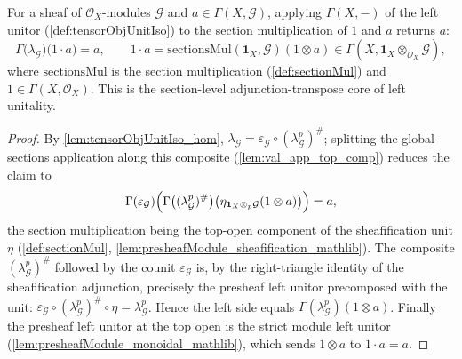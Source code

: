 \begin{lemma}
  \label{lem:sectionMul_unitor_core}
  For a sheaf of \(\mathcal{O}_X\)-modules \(\mathcal{G}\) and
  \(a \in \Gamma(X, \mathcal{G})\), applying \(\Gamma(X,-)\) of the left unitor
  (\cref{def:tensorObjUnitIso}) to the section multiplication of \(1\) and \(a\)
  returns \(a\):
  \[
    \Gamma\bigl(\lambda_{\mathcal{G}}\bigr)
      \bigl( 1 \cdot a \bigr) = a,
    \qquad
    1 \cdot a = \mathrm{sectionsMul}(\mathbf{1}_X, \mathcal{G})(1 \otimes a)
      \in \Gamma(X, \mathbf{1}_X \otimes_{\mathcal{O}_X} \mathcal{G}),
  \]
  where \(\mathrm{sectionsMul}\) is the section multiplication
  (\cref{def:sectionMul}) and \(1 \in \Gamma(X,\mathcal{O}_X)\). This is the
  section-level adjunction-transpose core of left unitality.
\end{lemma}

\begin{proof}
  By \cref{lem:tensorObjUnitIso_hom},
  \(\lambda_{\mathcal{G}} = \varepsilon_{\mathcal{G}} \circ
  (\lambda^p_{\mathcal{G}})^{\#}\); splitting the global-sections application along
  this composite (\cref{lem:val_app_top_comp}) reduces the claim to
  \[
    \Gamma(\varepsilon_{\mathcal{G}})
      \Bigl( \Gamma\bigl((\lambda^p_{\mathcal{G}})^{\#}\bigr)
        \bigl( \eta_{\mathbf{1}_X \otimes_p \mathcal{G}}(1 \otimes a) \bigr) \Bigr)
      = a,
  \]
  the section multiplication being the top-open component of the sheafification
  unit \(\eta\) (\cref{def:sectionMul},
  \cref{lem:presheafModule_sheafification_mathlib}). The composite
  \((\lambda^p_{\mathcal{G}})^{\#}\) followed by the counit
  \(\varepsilon_{\mathcal{G}}\) is, by the right-triangle identity of the
  sheafification adjunction, precisely the presheaf left unitor precomposed with
  the unit: \(\varepsilon_{\mathcal{G}} \circ (\lambda^p_{\mathcal{G}})^{\#} \circ
  \eta = \lambda^p_{\mathcal{G}}\). Hence the left side equals
  \(\Gamma(\lambda^p_{\mathcal{G}})(1 \otimes a)\). Finally the presheaf left
  unitor at the top open is the strict module left unitor
  (\cref{lem:presheafModule_monoidal_mathlib}), which sends \(1 \otimes a\) to
  \(1 \cdot a = a\).
\end{proof}

